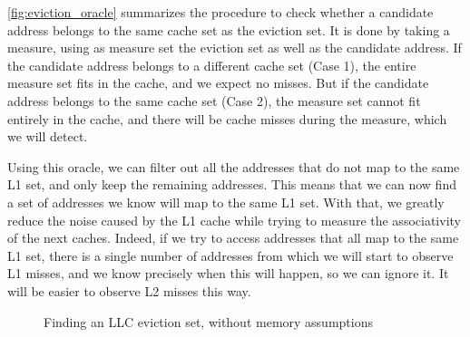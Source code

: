 \documentclass[a4paper,11pt,oneside]{report}
\begin{document}
\autoref{fig:eviction_oracle} summarizes the procedure to check whether a candidate address belongs to the same cache set as the eviction set. It is done by taking a measure, using as measure set the eviction set as well as the candidate address. If the candidate address belongs to a different cache set (Case 1), the entire measure set fits in the cache, and we expect no misses. But if the candidate address belongs to the same cache set (Case 2), the measure set cannot fit entirely in the cache, and there will be cache misses during the measure, which we will detect.

Using this oracle, we can filter out all the addresses that do not map to the same L1 set, and only keep the remaining addresses. This means that we can now find a set of addresses we know will map to the same L1 set. With that, we greatly reduce the noise caused by the L1 cache while trying to measure the associativity of the next caches. Indeed, if we try to access addresses that all map to the same L1 set, there is a single number of addresses from which we will start to observe L1 misses, and we know precisely when this will happen, so we can ignore it. It will be easier to observe L2 misses this way.

\begin{figure}
    \centering
    \caption{Finding an LLC eviction set, without memory assumptions}
    \label{fig:llc_eviction_iterative}
\end{figure}
\end{document}
